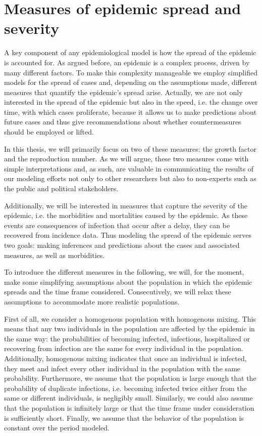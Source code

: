 \section[Measures of epidemic spread and severity]{Measures of epidemic spread and severity}
\label{sec:measures_of_epidemic_spread}
A key component of any epidemiological model is how the spread of the epidemic is accounted for. As argued before, an epidemic is a complex process, driven by many different factors. To make this complexity manageable we employ simplified models for the spread of cases and, depending on the assumptions made, different measures that quantify the epidemic's spread arise. Actually, we are not only interested in the spread of the epidemic but also in the speed, i.e. the change over time, with which cases proliferate, because it allows us to make predictions about future cases and thus give recommendations about whether countermeasures should be employed or lifted.

In this thesis, we will primarily focus on two of these measures: the growth factor and the reproduction number. As we will argue, these two measures come with simple interpretations and, as such, are valuable in communicating the results of our modeling efforts not only to other researchers but also to non-experts such as the public and political stakeholders.

Additionally, we will be interested in measures that capture the severity of the epidemic, i.e. the morbidities and mortalities caused by the epidemic. As these events are consequences of infection that occur after a delay, they can be recovered from incidence data. Thus modeling the spread of the epidemic serves two goals: making inferences and predictions about the cases and associated measures, as well as morbidities.

To introduce the different measures in the following, we will, for the moment, make some simplifying assumptions about the population in which the epidemic spreads and the time frame considered. Consecutively, we will relax these assumptions to accommodate more realistic populations. 

First of all, we consider a homogenous population with homogenous mixing. This means that any two individuals in the population are affected by the epidemic in the same way: the probabilities of becoming infected, infectious, hospitalized or recovering from infection are the same for every individual in the population. Additionally, homogenous mixing indicates that once an individual is infected, they meet and infect every other individual in the population with the same probability. 
Furthermore, we assume that the population is large enough that the probability of duplicate infections, i.e. becoming infected twice either from the same or different individuals, is negligibly small. Similarly, we could also assume that the population is infinitely large or that the time frame under consideration is sufficiently short.
Finally, we assume that the behavior of the population is constant over the period modeled. 

